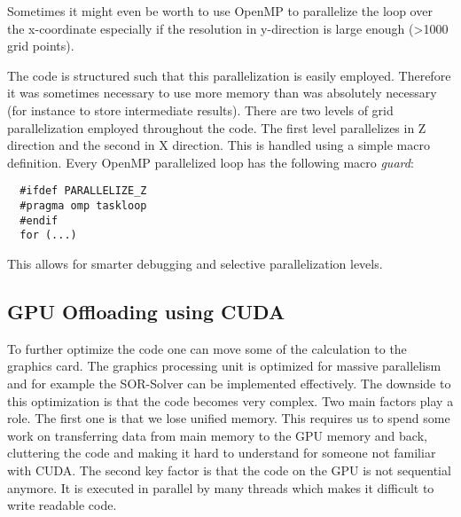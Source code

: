 \documentclass[master.tex]{subfiles}
\begin{document}
\begin{blockquote}
  \small
  Sometimes it might even be worth to use OpenMP to parallelize the loop over the x-coordinate especially if the resolution in y-direction is large enough (\textgreater 1000 grid points).
\end{blockquote}
The code is structured such that this parallelization is easily employed. Therefore it was sometimes necessary to use more memory than was absolutely necessary (for instance to store intermediate results).\newline
There are two levels of grid parallelization employed throughout the code. The first level parallelizes in Z direction and the second in X direction. This is handled using a simple macro definition. Every OpenMP parallelized loop has the following macro \textit{guard}:

\begin{lstlisting}
  #ifdef PARALLELIZE_Z
  #pragma omp taskloop
  #endif
  for (...)
\end{lstlisting}
This allows for smarter debugging and selective parallelization levels.

\subsection{GPU Offloading using CUDA}
To further optimize the code one can move some of the calculation to the graphics card. The graphics processing unit is optimized for massive parallelism and for example the SOR-Solver can be implemented effectively. The downside to this optimization is that the code becomes very complex. Two main factors play a role. The first one is that we lose unified memory. This requires us to spend some work on transferring data from main memory to the GPU memory and back, cluttering the code and making it hard to understand for someone not familiar with CUDA. The second key factor is that the code on the GPU is not sequential anymore. It is executed in parallel by many threads which makes it difficult to write readable code.\newline
\end{document}
